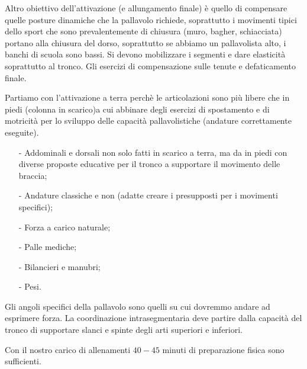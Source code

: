 Altro obiettivo dell'attivazione (e allungamento finale) è quello di compensare quelle posture
dinamiche che la pallavolo richiede, soprattutto i movimenti tipici dello sport che sono
prevalentemente di chiusura (muro, bagher, schiacciata) portano alla chiusura del dorso,
soprattutto se abbiamo un pallavolista alto, i banchi di scuola sono bassi.
Si devono mobilizzare i segmenti e dare elasticità soprattutto al tronco.
Gli esercizi di compensazione sulle tenute e defaticamento finale.

Partiamo con l'attivazione a terra perchè le articolazioni sono più libere che in piedi (colonna in
scarico)a cui abbinare degli esercizi di spostamento e di motricità per lo sviluppo delle capacità
pallavolistiche (andature correttamente eseguite).
\begin{enumerate}
\item[-]Addominali e dorsali non solo fatti in scarico a terra, ma da in piedi con diverse proposte educative
per il tronco a supportare il movimento delle braccia;
\item[-]Andature classiche e non (adatte creare i presupposti per i movimenti specifici);
\item[-]Forza a carico naturale;
\item[-]Palle mediche;
\item[-]Bilancieri e manubri;
\item[-]Pesi.
\end{enumerate}

Gli angoli specifici della pallavolo sono quelli su cui dovremmo andare ad esprimere forza. La coordinazione
intrasegmentaria deve partire dalla capacità del tronco di supportare slanci e spinte degli arti superiori e
inferiori.

Con il nostro carico di allenamenti $40-45$ minuti di preparazione fisica sono sufficienti.

